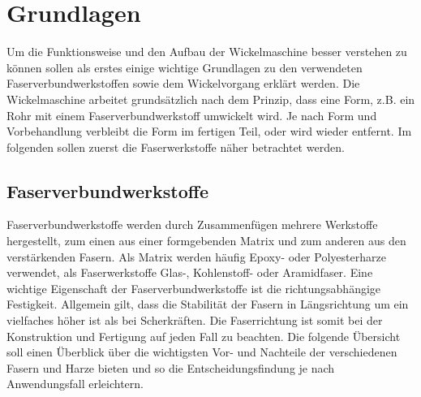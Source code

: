 \documentclass[12pt, a4paper, ngerman]{article}
\begin{document}
\section{Grundlagen}
Um die Funktionsweise und den Aufbau der Wickelmaschine besser verstehen zu können sollen als erstes einige wichtige Grundlagen zu den verwendeten Faserverbundwerkstoffen sowie dem Wickelvorgang erklärt werden. Die Wickelmaschine arbeitet grundsätzlich nach dem Prinzip, dass eine Form, z.B. ein Rohr mit einem Faserverbundwerkstoff umwickelt wird. Je nach Form und Vorbehandlung verbleibt die Form im fertigen Teil, oder wird wieder entfernt. Im folgenden sollen zuerst die Faserwerkstoffe näher betrachtet werden.

\subsection{Faserverbundwerkstoffe}
Faserverbundwerkstoffe werden durch Zusammenfügen mehrere Werkstoffe hergestellt, zum einen aus einer formgebenden Matrix und zum anderen aus den verstärkenden Fasern. Als Matrix werden häufig Epoxy- oder Polyesterharze verwendet, als Faserwerkstoffe Glas-, Kohlenstoff- oder Aramidfaser. Eine wichtige Eigenschaft der Faserverbundwerkstoffe ist die richtungsabhängige Festigkeit. Allgemein gilt, dass die Stabilität der Fasern in Längsrichtung um ein vielfaches höher ist als bei Scherkräften. Die Faserrichtung ist somit bei der Konstruktion und Fertigung auf jeden Fall zu beachten.  Die folgende Übersicht soll einen Überblick über die wichtigsten Vor- und Nachteile der verschiedenen Fasern und Harze bieten und so die Entscheidungsfindung je nach Anwendungsfall erleichtern.
\end{document}
